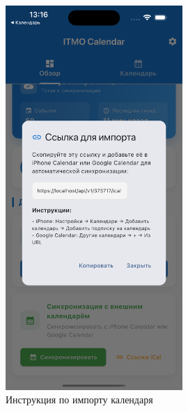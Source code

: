 \begin{figure}[h!]
    \centering
    \includegraphics[width=0.6\textwidth]{images/link-for-import-with-instruction.png}
    \caption{Инструкция по импорту календаря}
    \label{fig:import-link}
\end{figure}

